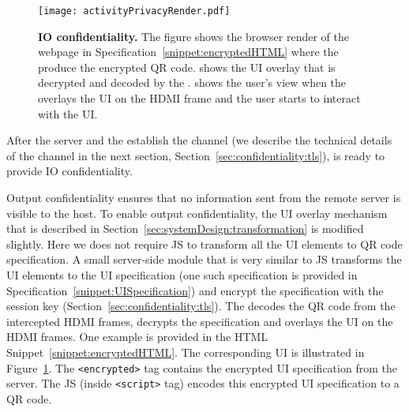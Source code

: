 \begin{figure}[t]
\centering
\texttt{[image: activityPrivacyRender.pdf]}
\caption{\textbf{\name IO confidentiality.} The figure shows \one the browser render of the webpage in Specification~\ref{snippet:encryptedHTML} where the \name \js produce the encrypted QR code. \two shows the UI overlay that is decrypted and decoded by the \device. \three shows the user's view when the \device overlays the UI on the HDMI frame and the user starts to interact with the UI.}

\spacesave
\label{fig:activityPrivacy}
\centering
\end{figure}

After the server and the \device establish the \tls channel (we describe the technical details of the \tls channel in the next section, Section~\ref{sec:confidentiality:tls}), \name is ready to provide IO confidentiality.

 Output confidentiality ensures that no information sent from the remote server is visible to the host. To enable output confidentiality, the UI overlay mechanism that is described in Section~\ref{sec:systemDesign:transformation} is modified slightly. Here we \name does not require \name JS to transform all the UI elements to QR code specification. A small server-side module that is very similar to \name JS transforms the UI elements to the UI specification (one such specification is provided in Specification~\ref{snippet:UISpecification}) and encrypt the specification with the \tls session key (Section~\ref{sec:confidentiality:tls}). The \device decodes the QR code from the intercepted HDMI frames, decrypts the specification and overlays the UI on the HDMI frames. One example is provided in the HTML Snippet~\ref{snippet:encryptedHTML}. The corresponding UI is illustrated in Figure~\ref{fig:activityPrivacy}. The \texttt{<encrypted>} tag contains the encrypted UI specification from the server. The \name JS (inside \texttt{<script>} tag) encodes this encrypted UI specification to a QR code.

